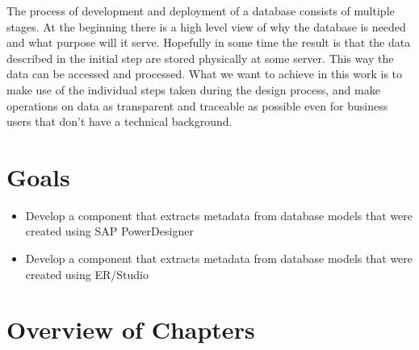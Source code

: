 


\par
The process of development and deployment of a database consists of multiple stages. At the beginning there is a high level view of why the database is needed and what purpose will it serve. Hopefully in some time the result is that the data described in the initial step are stored physically at some server. 
This way the data can be accessed and processed. 
What we want to achieve in this work is to make use of the individual steps taken during the design process, and make operations on data as transparent and traceable as possible even for business users that don't have a technical background.

\section{Goals}

\begin{itemize}
	\item Develop a component that extracts metadata from database models that were created using SAP PowerDesigner 
	\item Develop a component that extracts metadata from database models that were created using ER/Studio  \\
\end{itemize}

\section{Overview of Chapters}


